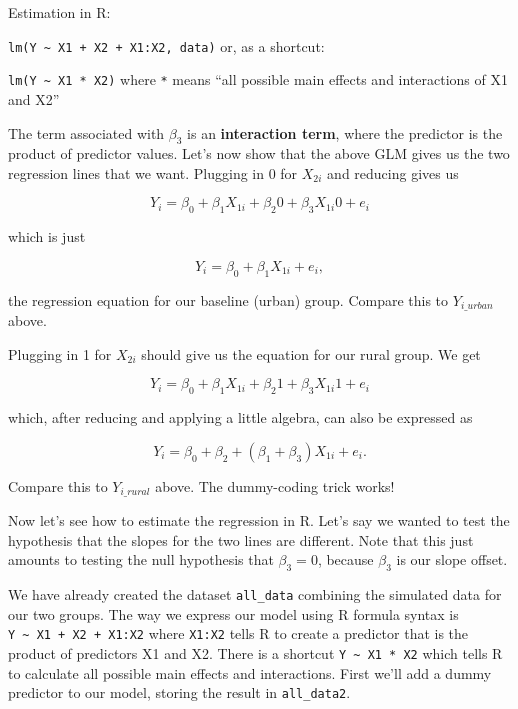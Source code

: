 \documentclass[]{book}
\newenvironment{Shaded}{\begin{snugshade}}{\end{snugshade}}
\newcommand{\DataTypeTok}[1]{\textcolor[rgb]{0.13,0.29,0.53}{#1}}
\newcommand{\DecValTok}[1]{\textcolor[rgb]{0.00,0.00,0.81}{#1}}
\newcommand{\KeywordTok}[1]{\textcolor[rgb]{0.13,0.29,0.53}{\textbf{#1}}}
\newcommand{\NormalTok}[1]{#1}
\newcommand{\OperatorTok}[1]{\textcolor[rgb]{0.81,0.36,0.00}{\textbf{#1}}}
\newcommand{\StringTok}[1]{\textcolor[rgb]{0.31,0.60,0.02}{#1}}
\begin{document}
Estimation in R:

\texttt{lm(Y\ \textasciitilde{}\ X1\ +\ X2\ +\ X1:X2,\ data)} or, as a shortcut:

\texttt{lm(Y\ \textasciitilde{}\ X1\ *\ X2)} where \texttt{*} means ``all possible main effects and interactions of X1 and X2''

The term associated with \(\beta_3\) is an \textbf{interaction term}, where the predictor is the product of predictor values. Let's now show that the above GLM gives us the two regression lines that we want. Plugging in 0 for \(X_{2i}\) and reducing gives us

\[Y_{i} = \beta_0 + \beta_1 X_{1i} + \beta_2 0 + \beta_3 X_{1i} 0 + e_i\]

which is just

\[Y_{i} = \beta_0 + \beta_1 X_{1i} + e_i,\]

the regression equation for our baseline (urban) group. Compare this to \(Y_{i\_urban}\) above.

Plugging in 1 for \(X_{2i}\) should give us the equation for our rural group. We get

\[Y_{i} = \beta_0 + \beta_1 X_{1i} + \beta_2 1 + \beta_3 X_{1i} 1 + e_i\]

which, after reducing and applying a little algebra, can also be expressed as

\[Y_{i} = \beta_0 + \beta_2 + (\beta_1 + \beta_3) X_{1i} + e_i.\]

Compare this to \(Y_{i\_rural}\) above. The dummy-coding trick works!

Now let's see how to estimate the regression in R. Let's say we wanted to test the hypothesis that the slopes for the two lines are different. Note that this just amounts to testing the null hypothesis that \(\beta_3 = 0\), because \(\beta_3\) is our slope offset.

We have already created the dataset \texttt{all\_data} combining the simulated data for our two groups. The way we express our model using R formula syntax is \texttt{Y\ \textasciitilde{}\ X1\ +\ X2\ +\ X1:X2} where \texttt{X1:X2} tells R to create a predictor that is the product of predictors X1 and X2. There is a shortcut \texttt{Y\ \textasciitilde{}\ X1\ *\ X2} which tells R to calculate all possible main effects and interactions. First we'll add a dummy predictor to our model, storing the result in \texttt{all\_data2}.

\begin{Shaded}
\end{Shaded}
\end{document}
